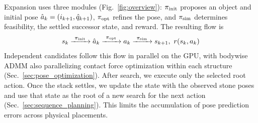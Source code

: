 Expansion uses three modules (Fig.~\ref{fig:overview}): $\pi_\text{init}$ proposes an object and initial pose $\hat{a}_k=(i_{k+1},\hat q_{k+1})$, $\pi_\text{opt}$ refines the pose, and $\pi_\text{sim}$ determines feasibility, the settled successor state, and reward.
The resulting flow is
\begin{equation*}
s_k
\xrightarrow{\ \pi_\text{init}\ }
\hat{a}_k
\xrightarrow{\ \pi_\text{opt}\ }
a_k
\xrightarrow{\ \pi_\text{sim}\ }
s_{k+1},\ r(s_k,a_k)
\end{equation*}
Independent candidates follow this flow in parallel on the GPU, with bodywise ADMM also parallelizing contact force optimization within each structure (Sec.~\ref{sec:pose_optimization}).
After search, we execute only the selected root action. 
Once the stack settles, we update the state with the observed stone poses and use that state as the root of a new search for the next action (Sec.~\ref{sec:sequence_planning}). 
This limits the accumulation of pose prediction errors across physical placements.
